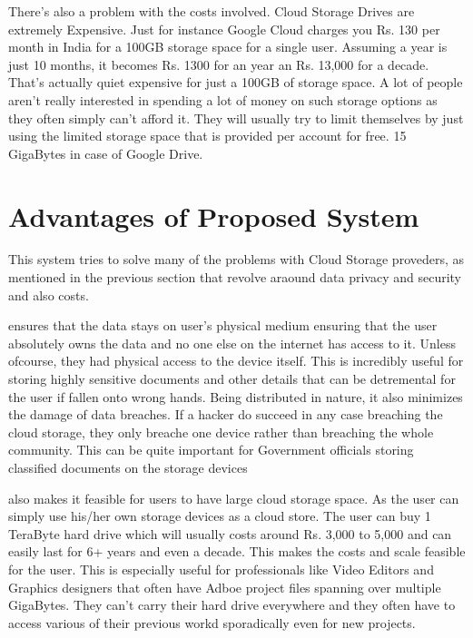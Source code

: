 \documentclass[12pt]{article}
\makeatletter
\let\inserttitle\@title
\makeatother
\begin{document}
There's also a problem with the costs involved. Cloud Storage Drives are extremely Expensive. Just for instance Google Cloud charges you Rs. 130 per month in India for a 100GB storage space for a single user. Assuming a year is just 10 months, it becomes Rs. 1300 for an year an Rs. 13,000 for a decade. That's actually quiet expensive for just a 100GB of storage space. A lot of people aren't really interested in spending a lot of money on such storage options as they often simply can't afford it. They will usually try to limit themselves by just using the limited storage space that is provided per account for free. 15 GigaBytes in case of Google Drive.


\section{Advantages of Proposed System}
\vspace{2cm}
\quad\quad This system tries to solve many of the problems with Cloud Storage proveders, as mentioned in the previous section that revolve araound data privacy and security and also costs. \\
\par
\inserttitle{} ensures that the data stays on user's physical medium ensuring that the user absolutely owns the data and no one else on the internet has access to it. Unless ofcourse, they had physical access to the device itself. This is incredibly useful for storing highly sensitive documents and other details that can be detremental for the user if fallen onto wrong hands. Being distributed in nature, it also minimizes the damage of data breaches. If a hacker do succeed in any case breaching the cloud storage, they only breache one device rather than breaching the whole community. This can be quite important for Government officials storing classified documents on the storage devices \\
\par
\inserttitle{} also makes it feasible for users to have large cloud storage space. As the user can simply use his/her own storage devices as a cloud store. The user can buy 1 TeraByte hard drive which will usually costs around Rs. 3,000 to 5,000 and can easily last for 6+ years and even a decade. This makes the costs and scale feasible for the user. This is especially useful for professionals like Video Editors and Graphics designers that often have Adboe project files spanning over multiple GigaBytes. They can't carry their hard drive everywhere and they often have to access various of their previous workd sporadically even for new projects.
\end{document}
